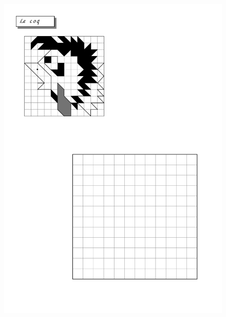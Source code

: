 \begin{figure}[H]
  \centering
  \includegraphics[width=\linewidth]{sources/pages/1.1.1/2-coq.pdf}
  \caption{\label{rhino}}
\end{figure}

